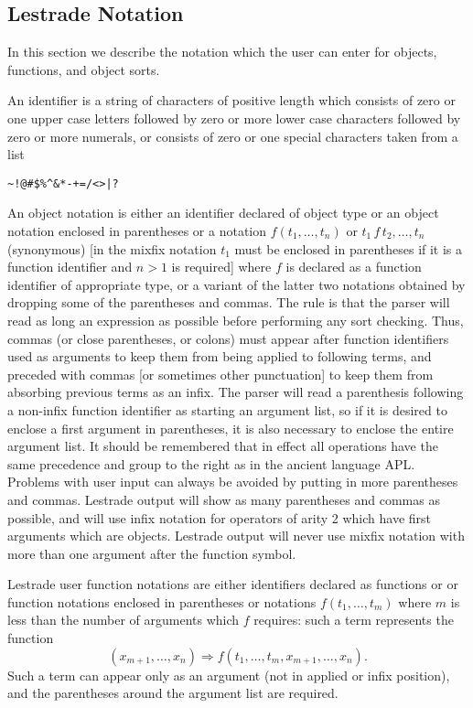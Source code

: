 \documentclass[12pt]{article}
\begin{document}
\subsection{Lestrade Notation}

In this section we describe the notation which the user can enter for objects, functions, and object sorts.

An identifier is a string of characters of positive length which consists of zero or one upper case letters followed by zero or more lower case characters followed by zero or more numerals, or consists of zero or one special characters taken from a list      \begin{verbatim}
~!@#$%^&*-+=/<>|?
\end{verbatim}

An object notation is either an identifier declared of object type or an object notation enclosed in parentheses or a notation $f(t_1,\ldots,t_n)$  or $t_1\, f \,t_2,\ldots,t_n$ (synonymous) [in the mixfix notation  $t_1$ must be enclosed in parentheses if it is a function identifier and $n>1$ is required]  where
$f$ is declared as a function identifier of appropriate type, or a variant of the latter two notations obtained by dropping some of the parentheses and commas.  The rule is that the parser will read as long an expression as possible before performing any sort checking.  Thus, commas (or close parentheses, or colons) must appear after function
identifiers used as arguments to keep them from being applied to following terms, and preceded with commas [or sometimes other punctuation]  to keep them from absorbing previous terms as an infix.  The parser will read a parenthesis following a non-infix function identifier as starting an argument list, so if it is desired to enclose a first argument in parentheses, it is also necessary to enclose the entire argument list.  It should be remembered that in effect all operations have the same precedence and group to the right as in the ancient language APL.  Problems with user input can always be avoided by putting in more parentheses and commas.  Lestrade output will show as many parentheses and commas as possible, and will use infix notation for operators of arity 2 which have first arguments which are objects.  Lestrade output will never use mixfix notation with more than one argument after the function symbol.

Lestrade user function notations are either identifiers declared as functions or or function notations enclosed in parentheses or notations $f(t_1,\ldots,t_m)$ where $m$ is less than the number of arguments which $f$ requires:  such a term represents the function $$(x_{m+1},\ldots,x_n) \Rightarrow f(t_1,\ldots,t_m,x_{m+1},\ldots,x_n).$$  Such a term can appear only as an argument (not in applied or infix position), and the parentheses around the argument list are required.
\end{document}
